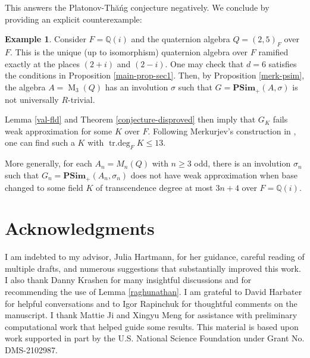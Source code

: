 \documentclass[11pt,letterpaper]{amsart}
\theoremstyle{plain}
\theoremstyle{definition}
\newtheorem{example}[theorem]{Example}
\theoremstyle{remark}
\begin{document}
This answers the Platonov-Th\u{a}\'{n}g conjecture negatively. We conclude by providing an explicit counterexample:

\begin{example}\label{example}
    Consider $F = \mathbb{Q}(i)$ and the quaternion algebra $Q = (2,5)_F$ over $F$. This is the unique (up to isomorphism) quaternion algebra over $F$ ramified exactly at the places $(2+i)$ and $(2-i)$. One may check that $d=6$ satisfies the conditions in Proposition \ref{main-prop-sec1}. Then, by Proposition \ref{merk-psim}, the algebra $A = \operatorname{M}_3(Q)$ has an involution $\sigma$ such that $G = \textbf{PSim}_+(A,\sigma)$ is not universally $R$-trivial.

    Lemma \ref{val-fld} and Theorem \ref{conjecture-disproved} then imply that $G_K$ fails weak approximation for some $K$ over $F$. Following Merkurjev's construction in \cite[Theorem 2, Lemma 8]{merkurjev1996r}, one can find such a $K$ with  $\operatorname{tr.deg}_FK\leq 13$.

    More generally, for each $A_n = M_n(Q)$ with $n\geq 3$ odd, there is an involution $\sigma_n$ such that $G_n = \textbf{PSim}_+(A_n,\sigma_n)$ does not have weak approximation when base changed to some field $K$ of transcendence degree at most $3n+4$ over $F = \mathbb{Q}(i)$.
\end{example}


\section*{Acknowledgments}
I am indebted to my advisor, Julia Hartmann, for her guidance, careful reading of multiple drafts, and numerous suggestions that substantially improved this work. I also thank Danny Krashen for many insightful discussions and for recommending the use of Lemma \ref{raghunathan}. I am grateful to David Harbater for helpful conversations and to Igor Rapinchuk for thoughtful comments on the manuscript. I thank Mattie Ji and Xingyu Meng for assistance with preliminary computational work that helped guide some results. This material is based upon work supported in part by the U.S. National Science Foundation under Grant No. DMS-2102987.


    



     
    {}
\end{document}
